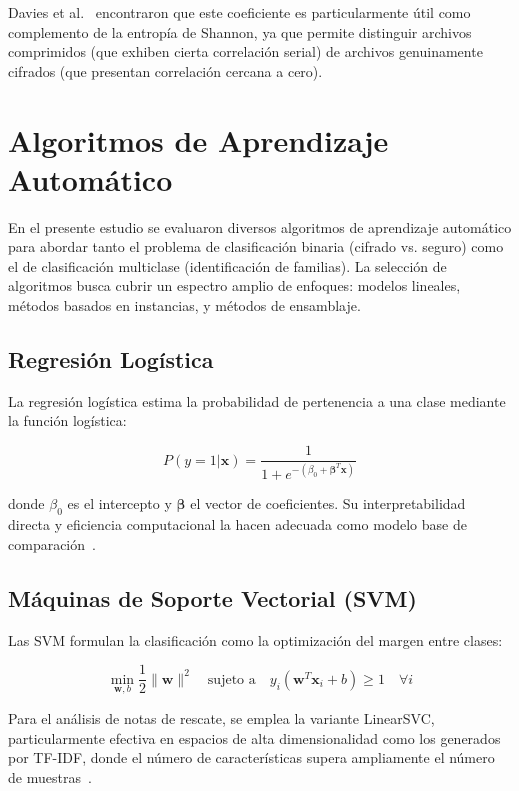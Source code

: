 Davies et al.~\cite{paper_4_comparison_of_entropy} encontraron que este coeficiente es particularmente útil como complemento de la entropía de Shannon, ya que permite distinguir archivos comprimidos (que exhiben cierta correlación serial) de archivos genuinamente cifrados (que presentan correlación cercana a cero).

\section{Algoritmos de Aprendizaje Automático}

En el presente estudio se evaluaron diversos algoritmos de aprendizaje automático para abordar tanto el problema de clasificación binaria (cifrado vs. seguro) como el de clasificación multiclase (identificación de familias). La selección de algoritmos busca cubrir un espectro amplio de enfoques: modelos lineales, métodos basados en instancias, y métodos de ensamblaje.

\subsection{Regresión Logística}

La regresión logística estima la probabilidad de pertenencia a una clase mediante la función logística:

\begin{equation}
    P(y = 1|\mathbf{x}) = \frac{1}{1 + e^{-(\beta_0 + \boldsymbol{\beta}^T \mathbf{x})}}
\end{equation}

donde $\beta_0$ es el intercepto y $\boldsymbol{\beta}$ el vector de coeficientes. Su interpretabilidad directa y eficiencia computacional la hacen adecuada como modelo base de comparación~\cite{hastie2009}.

\subsection{Máquinas de Soporte Vectorial (SVM)}

Las SVM formulan la clasificación como la optimización del margen entre clases:

\begin{equation}
    \min_{\mathbf{w},b} \frac{1}{2}\|\mathbf{w}\|^2 \quad \text{sujeto a} \quad y_i(\mathbf{w}^T\mathbf{x}_i + b) \geq 1 \quad \forall i
\end{equation}

Para el análisis de notas de rescate, se emplea la variante LinearSVC, particularmente efectiva en espacios de alta dimensionalidad como los generados por TF-IDF, donde el número de características supera ampliamente el número de muestras~\cite{joachims1998}.

